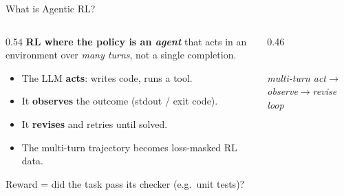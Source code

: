 \documentclass[aspectratio=169]{beamer}
\begin{document}
\begin{frame}{What is Agentic RL?}
  \begin{columns}[T]
    \begin{column}{0.54\textwidth}
      \textbf{RL where the policy is an \emph{agent}} that acts in an environment over
      \emph{many turns}, not a single completion.
      \vspace{0.3em}
      \begin{itemize}\setlength\itemsep{0.25em}
        \item The LLM \textbf{acts}: writes code, runs a tool.
        \item It \textbf{observes} the outcome (stdout / exit code).
        \item It \textbf{revises} and retries until solved.
        \item The multi-turn trajectory becomes loss-masked RL data.
      \end{itemize}
      \vspace{0.3em}
      \footnotesize Reward = did the task pass its checker (e.g.\ unit tests)?
    \end{column}
    \begin{column}{0.46\textwidth}
      \centering
      \\[0.2em]{\scriptsize\itshape multi-turn act$\to$observe$\to$revise loop}
    \end{column}
  \end{columns}
\end{frame}
\end{document}
